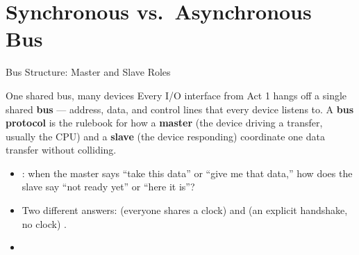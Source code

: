 \documentclass[aspectratio=169]{beamer}
\begin{document}
\section{Synchronous vs.\ Asynchronous Bus}

\begin{frame}{Bus Structure: Master and Slave Roles}
  \begin{block}{One shared bus, many devices}
    Every I/O interface from Act 1 hangs off a single shared \textbf{bus} ---
    address, data, and control lines that every device listens to. A
    \textbf{bus protocol} is the rulebook for how a \textbf{master} (the
    device driving a transfer, usually the CPU) and a \textbf{slave} (the
    device responding) coordinate one data transfer without colliding.
  \end{block}
  \begin{itemize}
    \item {}: when the master says ``take this data'' or
      ``give me that data,'' how does the slave say ``not ready yet'' or ``here
      it is''?
    \item Two different answers:  (everyone shares a clock)
      and  (an explicit handshake, no clock)
      \cite{Hamacher2002_computer_organization}.
    \item {}
  \end{itemize}
\end{frame}
\end{document}

